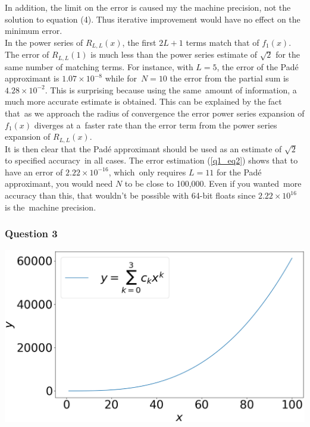 \documentclass[12pt, a4paper]{article}
\begin{document}
In addition, the limit on the error is caused my the machine precision, 
not the solution to equation (4). Thus iterative improvement would have 
no effect on the minimum error.
\\

In the power series of $R_{L,L}(x)$, the first $2L+1$ terms match that 
of $f_{1}(x)$. The error of $R_{L,L}(1)$ is much less than the power 
series estimate of $\sqrt{2}$ for the same number of matching terms.
For instance, with $L = 5$, the error of the Pad\'e approximant is $1.07 \times 10^{-8}$ while for\ 
$N=10$ the error from the partial sum is $4.28 \times 10^{-2}$. This is surprising because using the same\
amount of information, a much more accurate estimate is obtained. This can be explained by the fact that\ 
as we approach the radius of convergence the error power series expansion of $f_{1}(x)$ diverges at a\
faster rate than the error term from the power series expansion of $R_{L,L}(x)$.
\\

It is then clear that the Pad\'e approximant should be used as an estimate of $\sqrt{2}$ to specified accuracy\
in all cases. The error estimation (\ref{q1_eq2}) shows that to have an error of $2.22\times10^{-16}$, which\ 
only requires $L=11$ for the Pad\'e approximant, you would need $N$ to be close to 100,000. Even if you wanted\ 
more accuracy than this, that wouldn't be possible with 64-bit floats since $2.22\times10^{16}$ is the\ 
machine precision.


\subsubsection*{Question 3}

\begin{minipage}{\textwidth}\centering
	\includegraphics[width=\linewidth]{q3_N=3}

	\vspace*{-0.2cm}

	\label{q3_N=3}
\end{minipage}
\vspace{1cm}
\end{document}
